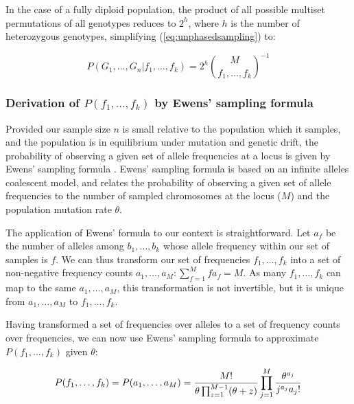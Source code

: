 \documentclass{article}
\begin{document}
In the case of a fully diploid population, the product of all possible multiset permutations of all genotypes reduces to $2^h$, where $h$ is the number of heterozygous genotypes, simplifying (\ref{eq:unphasedsampling}) to:

\begin{equation}
P(G_1,\ldots,G_n | f_1,\ldots,f_k) =
2^h
{ M \choose f_1,\ldots,f_k }^{-1}
\end{equation}


\subsubsection{Derivation of $P(f_1,\ldots,f_k)$ by Ewens' sampling formula}

Provided our sample size $n$ is small relative to the population which it samples, and the population is in equilibrium under mutation and genetic drift, the probability of observing a given set of allele frequencies at a locus is given by Ewens' sampling formula \citep{ewens72}.  Ewens' sampling formula is based on an infinite alleles coalescent model, and relates the probability of observing a given set of allele frequencies to the number of sampled chromosomes at the locus ($M$) and the population mutation rate $\theta$.

The application of Ewens' formula to our context is straightforward.  Let $a_f$ be the number of alleles among $b_1,\ldots,b_k$ whose allele frequency within our set of samples is $f$.  We can thus transform our set of frequencies $f_1,\ldots,f_k$ into a set of non-negative frequency counts $a_1,\ldots,a_M : \sum_{f=1}^M{fa_f} = M$.  As many $f_1,\ldots,f_k$ can map to the same $a_1,\ldots,a_M$, this transformation is not invertible, but it is unique from $a_1,\ldots,a_M$ to $f_1,\ldots,f_k$.

Having transformed a set of frequencies over alleles to a set of frequency counts over frequencies, we can now use Ewens' sampling formula to approximate $P(f_1,\ldots,f_k)$ given $\theta$:

\begin{equation}
P(f_1,\ldots,f_k) =
P(a_1,\ldots,a_M) = 
{M! \over \theta \prod_{z=1}^{M-1}(\theta+z)}
\prod_{j=1}^M{\theta^{a_j} \over j^{a_j} a_j!}
\end{equation}
\end{document}
